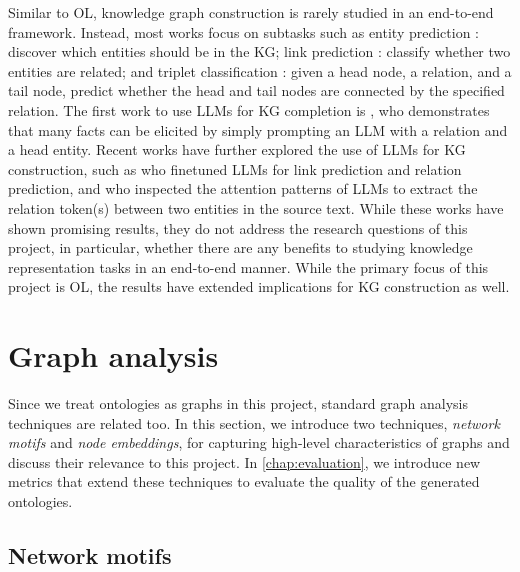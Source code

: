 Similar to OL, knowledge graph construction is rarely studied in an end-to-end framework. Instead, most works focus on subtasks such as entity prediction \cite{lin2015modeling,xie2016representation}: discover which entities should be in the KG; link prediction \cite{liben2003link,trouillon2016complex}: classify whether two entities are related; and triplet classification \cite{lin2015learning,wang2014knowledge}: given a head node, a relation, and a tail node, predict whether the head and tail nodes are connected by the specified relation. The first work to use LLMs for KG completion is \citet{petroni2019language}, who demonstrates that many facts can be elicited by simply prompting an LLM with a relation and a head entity. Recent works have further explored the use of LLMs for KG construction, such as \citet{yao2023exploring} who finetuned LLMs for link prediction and relation prediction, and \citet{wang2020language} who inspected the attention patterns of LLMs to extract the relation token(s) between two entities in the source text. While these works have shown promising results, they do not address the research questions of this project, in particular, whether there are any benefits to studying knowledge representation tasks in an end-to-end manner. While the primary focus of this project is OL, the results have extended implications for KG construction as well.

\section{Graph analysis}  \label{sec:graph}

Since we treat ontologies as graphs in this project, standard graph analysis techniques are related too. In this section, we introduce two techniques, \emph{network motifs} and \emph{node embeddings}, for capturing high-level characteristics of graphs and discuss their relevance to this project. In \cref{chap:evaluation}, we introduce new metrics that extend these techniques to evaluate the quality of the generated ontologies.

\subsection{Network motifs}  \label{sec:network-motifs}


